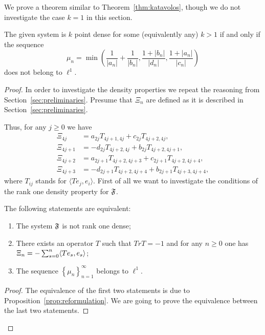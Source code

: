   We prove a theorem similar to Theorem~\ref{thm:katavolos}, though we do not investigate the case $k = 1$ in this section.
    \begin{theorem}
      The given system is $k$ point dense for some (equivalently any) $k > 1$ if and only if the sequence
      \[
        \mu_n = \min\left(\frac{1}{\lvert a_n \rvert} + \frac{1}{\lvert b_n \rvert}, \frac{1 + \lvert b_n\rvert}{\lvert d_n\rvert}, \frac{1 + \lvert a_n\rvert}{\lvert c_n\rvert}\right)
      \]
        does not belong to $\ell^1$.
    \end{theorem}
    \begin{proof}
      In order to investigate the density properties we repeat the reasoning from Section~\ref{sec:preliminaries}.
      Presume that $\Xi_n$ are defined as it is described in Section~\ref{sec:preliminaries}.

      Thus, for any $j \geq 0$ we have
      \begin{align*}
        \Xi_{4j} &= a_{2j} T_{4j+1, 4j} + c_{2j} T_{4j+2, 4j},\\
        \Xi_{4j + 1} &= -d_{2j} T_{4j+2, 4j} + b_{2j} T_{4j+2, 4j+1},\\
        \Xi_{4j + 2} &= a_{2j+1} T_{4j+2, 4j+3} + c_{2j+1} T_{4j+2, 4j+4},\\
        \Xi_{4j + 3} &= -d_{2j+1} T_{4j+2, 4j+4} + b_{2j+1} T_{4j+3, 4j+4},
      \end{align*}
        where $T_{ij}$ stands for $\langle Te_j, e_i \rangle$.
      First of all we want to investigate the conditions of the rank one density property for $\mathfrak{F}$.
      \begin{prop}
        \label{prop:inf-dim}
        The following statements are equivalent:
        \begin{enumerate}
          \item The system $\mathfrak{F}$ is not rank one dense;
          \item There exists an operator $T$ such that $TrT = -1$ and for any $n \geq 0$ one has $\Xi_n = -\sum_{s=0}^n \langle Te_s, e_s \rangle$;
          \item The sequence $\left\{\mu_n\right\}_{n=1}^\infty$ belongs to $\ell^1$.
        \end{enumerate}
      \end{prop}
      \begin{proof}
        The equivalence of the first two statements is due to Proposition~\ref{prop:reformulation}.
        We are going to prove the equivalence between the last two statements.


\end{proof}
\end{proof}
